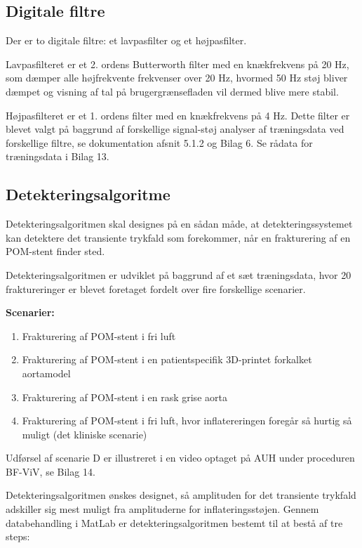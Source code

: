 \subsection{Digitale filtre}\label{SW_design_filtre}
Der er to digitale filtre: et lavpasfilter og et højpasfilter. 

Lavpasfilteret er et 2. ordens Butterworth filter med en knækfrekvens på 20 Hz, som dæmper alle højfrekvente frekvenser over 20 Hz, hvormed 50 Hz støj bliver dæmpet og visning af tal på brugergrænsefladen vil dermed blive mere stabil. 

Højpasfilteret er et 1. ordens filter med en knækfrekvens på 4 Hz. Dette filter er blevet valgt på baggrund af forskellige signal-støj analyser af træningsdata ved forskellige filtre, se dokumentation afsnit 5.1.2 og Bilag 6. Se rådata for træningsdata i Bilag 13.  

\subsection{Detekteringsalgoritme}
Detekteringsalgoritmen skal designes på en sådan måde, at detekteringssystemet kan detektere det transiente trykfald som forekommer, når en frakturering af en POM-stent finder sted.

Detekteringsalgoritmen er udviklet på baggrund af et sæt træningsdata, hvor 20 fraktureringer er blevet foretaget fordelt over fire forskellige scenarier.  

\textbf{Scenarier:}
\begin{enumerate}[label=(\Alph*)]
	\item Frakturering af POM-stent i fri luft 
	\item Frakturering af POM-stent i en patientspecifik 3D-printet forkalket aortamodel
	\item Frakturering af POM-stent i en rask grise aorta
	\item Frakturering af POM-stent i fri luft, hvor inflatereringen foregår så hurtig så muligt (det kliniske scenarie) 
\end{enumerate} 

Udførsel af scenarie D er illustreret i en video optaget på AUH under proceduren BF-ViV, se Bilag 14. 

Detekteringsalgoritmen ønskes designet, så amplituden for det transiente trykfald adskiller sig mest muligt fra amplituderne for inflateringsstøjen. Gennem databehandling i MatLab er detekteringsalgoritmen bestemt til at bestå af tre steps:  

